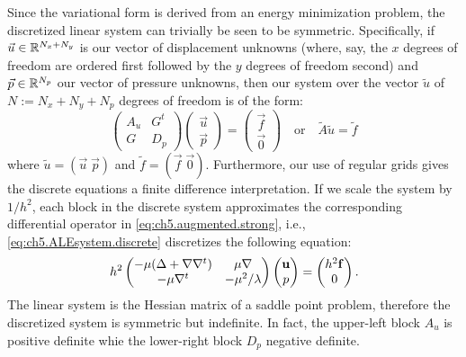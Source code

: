 Since the variational form is derived from an energy minimization problem, the discretized linear system can trivially be seen to be symmetric. Specifically, if $\vec{u} \in \mathbb{R}^{N_x + N_y}$ is our vector of displacement unknowns (where, say, the $x$ degrees of freedom are ordered first followed by the $y$ degrees of freedom second) and $\vec{p} \in \mathbb{R}^{N_p}$ our vector of pressure unknowns, then our system over the vector $\tilde{u}$ of $N := N_x + N_y + N_p$ degrees of freedom is of the form:
\begin{equation} \label{eq:ch5.ALEsystem.discrete}
\begin{pmatrix} A_u & G^t \\ G & D_p \end{pmatrix}
\begin{pmatrix} \vec{u} \\ \vec{p} \end{pmatrix}
= \begin{pmatrix} \vec{f} \\ \vec{0} \end{pmatrix}
\quad \text{or} \quad \tilde{A} \tilde{u} = \tilde{f}
\end{equation}
where $\tilde{u} = (\vec{u} \; \vec{p})$ and $\tilde{f} = (\vec{f} \; \vec{0})$. Furthermore, our use of regular grids gives the discrete equations a finite difference interpretation. If we scale the system by $1/h^2$, each block in the discrete system approximates the corresponding differential operator in \eqref{eq:ch5.augmented.strong}, i.e., \eqref{eq:ch5.ALEsystem.discrete} discretizes the following equation:
\begin{equation} \label{eq:ch5.ALEsystem.continuous}
h^2 \begin{pmatrix} -\mu (\Delta + \nabla \nabla^t) & \mu \nabla \\ -\mu \nabla^t & -\mu^2/\lambda \end{pmatrix}
\begin{pmatrix} \mathbf{u} \\ p \end{pmatrix}
= \begin{pmatrix} h^2 \mathbf{f} \\ 0 \end{pmatrix}.
\end{equation}
The linear system is the Hessian matrix of a saddle point problem, therefore the discretized system is symmetric but indefinite. In fact, the upper-left block $A_u$ is positive definite whie the lower-right block $D_p$ negative definite.

